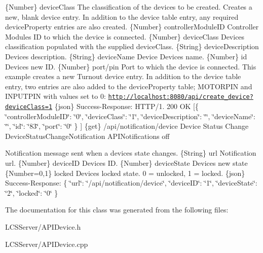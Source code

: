 \{Number\} device\+Class The classification of the device\textquotesingle{}s to be created.  Creates a new, blank device entry. In addition to the device table entry, any required device\+Property entries are also created.  \{Number\} controller\+Module\+ID Controller Module\textquotesingle{}s ID to which the device is connected.  \{Number\} device\+Class Device\textquotesingle{}s classification populated with the supplied device\+Class.  \{String\} device\+Description Device\textquotesingle{}s description.  \{String\} device\+Name Device Device\textquotesingle{}s name.  \{Number\} id Device\textquotesingle{}s new ID.  \{Number\} port/pin Port to which the device is connected.  This example creates a new Turnout device entry. In addition to the device table entry, two entries are also added to the device\+Property table; M\+O\+T\+O\+R\+P\+IN and I\+N\+P\+U\+T\+P\+IN with values set to 0\+: \href{http://localhost:8080/api/create_device?deviceClass=1}{\tt http\+://localhost\+:8080/api/create\+\_\+device?device\+Class=1}  \{json\} Success-\/\+Response\+: H\+T\+T\+P/1. 200 OK \mbox{[}\{ \char`\"{}controller\+Module\+I\+D\char`\"{}\+: \char`\"{}0\char`\"{}, \char`\"{}device\+Class\char`\"{}\+: \char`\"{}1\char`\"{}, \char`\"{}device\+Description\char`\"{}\+: \char`\"{}\char`\"{}, \char`\"{}device\+Name\char`\"{}\+: \char`\"{}\char`\"{}, \char`\"{}id\char`\"{}\+: \char`\"{}83\char`\"{}, \char`\"{}port\char`\"{}\+: \char`\"{}0\char`\"{} \} \mbox{]}  \{get\} /api/notification/device Device Status Change  Device\+Status\+Change\+Notification  A\+P\+I\+Notifications  off

Notification message sent when a device\textquotesingle{}s state changes.  \{String\} url Notification url.  \{Number\} device\+ID Device\textquotesingle{}s ID.  \{Number\} device\+State Device\textquotesingle{}s new state  \{Number=0,1\} locked Device\textquotesingle{}s locked state. 0 = unlocked, 1 = locked.  \{json\} Success-\/\+Response\+: \{ \char`\"{}url\char`\"{}\+: \char`\"{}/api/notification/device\char`\"{}, \char`\"{}device\+I\+D\char`\"{}\+: \char`\"{}1\char`\"{}, \char`\"{}device\+State\char`\"{}\+: \char`\"{}2\char`\"{}, \char`\"{}locked\char`\"{}\+: \char`\"{}0\char`\"{} \} 

The documentation for this class was generated from the following files\+:\begin{DoxyCompactItemize}
\item 
L\+C\+S\+Server/A\+P\+I\+Device.\+h\item 
L\+C\+S\+Server/A\+P\+I\+Device.\+cpp\end{DoxyCompactItemize}
